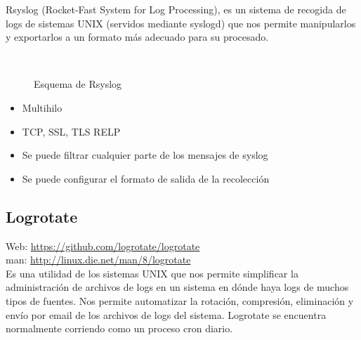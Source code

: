 Rsyslog (Rocket-Fast System for Log Processing), es un sistema de recogida de logs de sistemas UNIX (servidos mediante syslogd) que nos permite manipularlos y exportarlos a un formato más adecuado para su procesado.\\
\begin{figure}[H]
  \\
  \caption{Esquema de Rsyslog}
\end{figure}

\begin{itemize}
\item Multihilo
\item TCP, SSL, TLS RELP
\item Se puede filtrar cualquier parte de los mensajes de syslog
\item Se puede configurar el formato de salida de la recolección
\end{itemize}

\subsection{Logrotate}
\label{subsection:logrotate}

Web: \url{https://github.com/logrotate/logrotate}\\
man: \url{http://linux.die.net/man/8/logrotate}\\

Es una utilidad de los sistemas UNIX que nos permite simplificar la administración de archivos de logs en un sistema en dónde haya logs de muchos tipos de fuentes. Nos permite automatizar la rotación, compresión, eliminación y envío por email de los archivos de logs del sistema. Logrotate se encuentra normalmente corriendo como un proceso cron diario. \\

